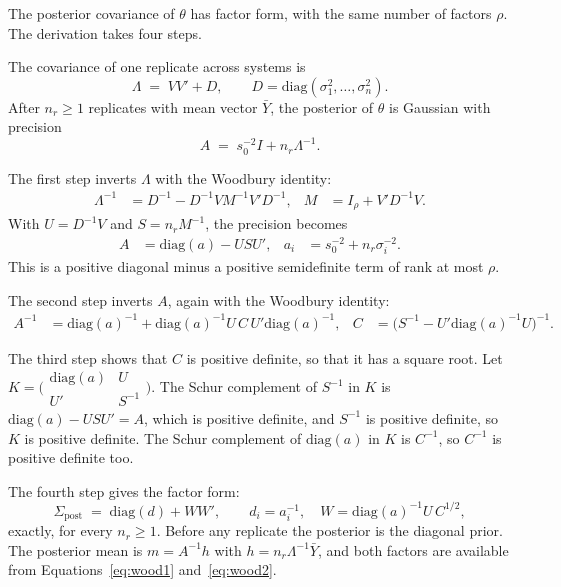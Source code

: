 \documentclass[11pt]{article}
\begin{document}
The posterior covariance of $\theta$ has factor form, with the same
number of factors $\rho$. The derivation takes four
steps.

The covariance of one replicate across systems is
\begin{equation}
\Lambda \;=\; V V' + D, \qquad D = \mathrm{diag}(\sigma_1^2, \dots,
\sigma_n^2).
\end{equation}
After $n_r \ge 1$ replicates with mean vector $\bar{Y}$, the posterior
of $\theta$ is Gaussian with precision
\begin{equation}
A \;=\; s_0^{-2} I + n_r \Lambda^{-1}.
\label{eq:precision}
\end{equation}

The first step inverts $\Lambda$ with the Woodbury identity:
\begin{align}
\Lambda^{-1} &= D^{-1} - D^{-1} V M^{-1} V' D^{-1},
& M &= I_\rho + V' D^{-1} V.
\label{eq:wood1}
\end{align}
With $U = D^{-1} V$ and $S = n_r M^{-1}$, the precision becomes
\begin{align}
A &= \mathrm{diag}(a) - U S U', & a_i &= s_0^{-2} + n_r \sigma_i^{-2}.
\label{eq:diagminus}
\end{align}
This is a positive diagonal minus a positive semidefinite term of
rank at most $\rho$.

The second step inverts $A$, again with the Woodbury identity:
\begin{align}
A^{-1} &= \mathrm{diag}(a)^{-1} + \mathrm{diag}(a)^{-1} U \, C \, U'
\mathrm{diag}(a)^{-1},
& C &= \bigl(S^{-1} - U' \mathrm{diag}(a)^{-1} U\bigr)^{-1}.
\label{eq:wood2}
\end{align}

The third step shows that $C$ is positive definite, so that it has a
square root. Let
$K = \bigl(\begin{smallmatrix} \mathrm{diag}(a) & U \\ U' & S^{-1}
\end{smallmatrix}\bigr)$. The Schur complement of $S^{-1}$ in $K$ is
$\mathrm{diag}(a) - USU' = A$, which is positive definite, and
$S^{-1}$ is positive definite, so $K$ is positive definite. The Schur
complement of $\mathrm{diag}(a)$ in $K$ is $C^{-1}$, so $C^{-1}$ is
positive definite too.

The fourth step gives the factor form:
\begin{equation}
\Sigma_{\text{post}} \;=\; \mathrm{diag}(d) + W W', \qquad
d_i = a_i^{-1}, \quad
W = \mathrm{diag}(a)^{-1} U \, C^{1/2},
\label{eq:postform}
\end{equation}
exactly, for every $n_r \ge 1$. Before any replicate the posterior is
the diagonal prior. The posterior mean is $m = A^{-1} h$ with
$h = n_r \Lambda^{-1} \bar{Y}$, and both factors are available from
Equations~\eqref{eq:wood1} and~\eqref{eq:wood2}.
\end{document}
